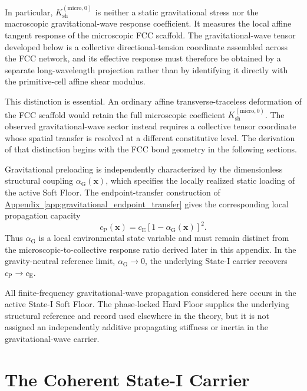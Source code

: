 In particular, $K_{\mathrm{sh}}^{(\mathrm{micro},0)}$ is neither a static gravitational stress nor the macroscopic gravitational-wave response coefficient. It measures the local affine tangent response of the microscopic FCC scaffold. The gravitational-wave tensor developed below is a collective directional-tension coordinate assembled across the FCC network, and its effective response must therefore be obtained by a separate long-wavelength projection rather than by identifying it directly with the primitive-cell affine shear modulus.

This distinction is essential. An ordinary affine transverse-traceless deformation of the FCC scaffold would retain the full microscopic coefficient $K_{\mathrm{sh}}^{(\mathrm{micro},0)}$. The observed gravitational-wave sector instead requires a collective tensor coordinate whose spatial transfer is resolved at a different constitutive level. The derivation of that distinction begins with the FCC bond geometry in the following sections.

Gravitational preloading is independently characterized by the dimensionless structural coupling $\alpha_{\mathrm{G}}(\mathbf{x})$, which specifies the locally realized static loading of the active Soft Floor. The endpoint-transfer construction of \hyperref[app:gravitational_endpoint_transfer]{Appendix~\ref*{app:gravitational_endpoint_transfer}} gives the corresponding local propagation capacity
\begin{equation}
    c_{\mathrm{P}}(\mathbf{x}) = c_{\mathrm{E}} \left[1-\alpha_{\mathrm{G}}(\mathbf{x})\right]^2.
\end{equation}
Thus $\alpha_{\mathrm{G}}$ is a local environmental state variable and must remain distinct from the microscopic-to-collective response ratio derived later in this appendix. In the gravity-neutral reference limit, $\alpha_{\mathrm{G}} \rightarrow 0$, the underlying State-I carrier recovers $c_{\mathrm{P}} \rightarrow c_{\mathrm{E}}$.

All finite-frequency gravitational-wave propagation considered here occurs in the active State-I Soft Floor. The phase-locked Hard Floor supplies the underlying structural reference and record used elsewhere in the theory, but it is not assigned an independently additive propagating stiffness or inertia in the gravitational-wave carrier.

\section{The Coherent State-I Carrier}
\label{sec:n2_coherent_carrier}

